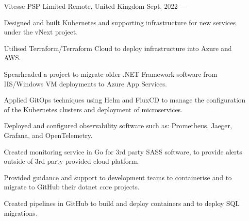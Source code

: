 

\begin{cventries}

    {Vitesse PSP Limited}
    {Remote, United Kingdom}
    {Sept. 2022 — }
    {
        \begin{cvitems}
        \item{Designed and built Kubernetes and supporting infrastructure for new services under the vNext project.}
        \item{Utilised Terraform/Terraform Cloud to deploy infrastructure into Azure and AWS.}
        \item{Spearheaded a project to migrate older .NET Framework software from IIS/Windows VM deployments to Azure App Services.}
        \item{Applied GitOps techniques using Helm and FluxCD to manage the configuration of the Kubernetes clusters and deployment of microservices.}
        \item{Deployed and configured observability software such as: Prometheus, Jaeger, Grafana, and OpenTelemetry.}
        \item{Created monitoring service in Go for 3rd party SASS software, to provide alerts outside of 3rd party provided cloud platform.}
        \item{Provided guidance and support to development teams to containerise and to migrate to GitHub their dotnet core projects.}
        \item{Created pipelines in GitHub to build and deploy containers and to deploy SQL migrations.}
        \end{cvitems}
    }


\end{cventries}

